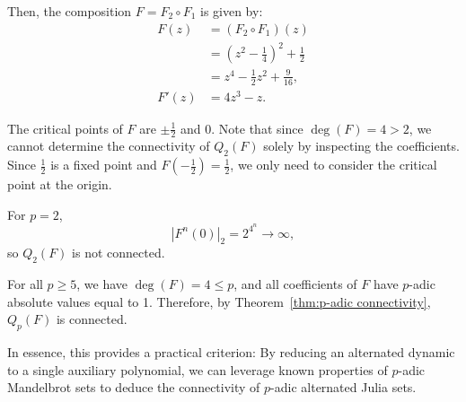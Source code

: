 \documentclass{amsart}
\theoremstyle{plain}
\theoremstyle{definition}
\theoremstyle{remark}
\numberwithin{equation}{section}
\begin{document}
Then, the composition \( F = F_2 \circ F_1 \) is given by:
\begin{align*}
  F(z) &= (F_2 \circ F_1)(z) \\
       &= \left(z^2 - \frac{1}{4}\right)^2 + \frac{1}{2} \\
       &= z^4 - \frac{1}{2} z^2 + \frac{9}{16}, \\
  F'(z) &= 4z^3 - z.
\end{align*}

The critical points of \( F \) are \( \pm \frac{1}{2} \) and \( 0 \). Note that since \(\deg(F) = 4 > 2 \), we cannot determine the connectivity of \( Q_2(F) \) solely by inspecting the coefficients. Since \( \frac{1}{2} \) is a fixed point and $F(-\frac{1}{2}) = \frac{1}{2}$, we only need to consider the critical point at the origin.

For \( p = 2 \),
\[
  |F^n(0)|_2 = 2^{4^n} \to \infty,
\]
so \( Q_2(F) \) is not connected.

For all \( p \geq 5 \), we have \( \deg(F) = 4 \leq p \), and all coefficients of \( F \) have \( p \)-adic absolute values equal to 1. Therefore, by Theorem~\ref{thm:p-adic connectivity}, \( Q_p(F) \) is connected.

In essence, this provides a practical criterion: By reducing an alternated dynamic to a single auxiliary polynomial, we can leverage known properties of $p$-adic Mandelbrot sets to deduce the connectivity of $p$-adic alternated Julia sets.

{}

\end{document}
